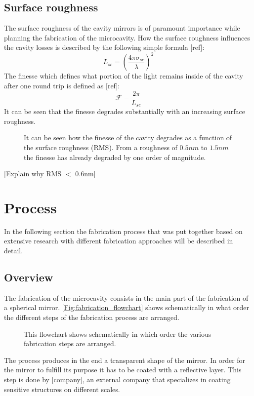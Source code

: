 
\subsection{Surface roughness}
The surface roughness of the cavity mirrors is of paramount importance while planning the fabrication of the microcavity. How the surface roughness influences the cavity losses is described by the following simple formula [ref]:
\begin{equation}
	L_{\si{sc}}=\left(\frac{4\pi\sigma_{\si{sc}}}{\lambda}\right)^2
\end{equation}
The finesse which defines what portion of the light remains inside of the cavity after one round trip is defined as [ref]:
\begin{equation}
	\mathcal{F}=\frac{2\pi}{L_{\si{sc}}}
\end{equation}
It can be seen that the finesse degrades substantially with an increasing surface roughness.
\begin{figure}[H]
	
	\caption{It can be seen how the finesse of the cavity degrades as a function of the surface roughness (RMS). From a roughness of $0.5\si{nm}$ to $1.5\si{nm}$ the finesse has already degraded by one order of magnitude.}
\end{figure}
[Explain why RMS $<$ 0.6nm]
\newpage

\section{Process}
In the following section the fabrication process that was put together based on extensive research with different fabrication approaches will be described in detail.

\subsection{Overview}
The fabrication of the microcavity consists in the main part of the fabrication of a spherical mirror. \autoref{Fig:fabrication_flowchart} shows schematically in what order the different steps of the fabrication process are arranged.
\begin{figure}[H]
	
	\caption{This flowchart shows schematically in which order the various fabrication steps are arranged.}
	\label{Fig:fabrication_flowchart}
\end{figure}
The process produces in the end a transparent shape of the mirror. In order for the mirror to fulfill its purpose it has to be coated with a reflective layer. This step is done by [company], an external company that specializes in coating sensitive structures on different scales.
